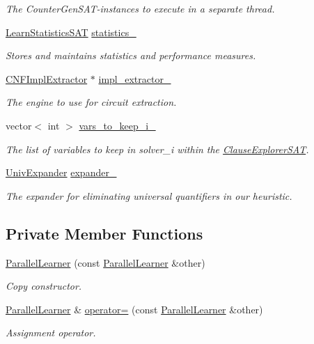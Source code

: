 \begin{DoxyCompactItemize}
\begin{DoxyCompactList}\small\item\em The Counter\-Gen\-S\-A\-T-\/instances to execute in a separate thread. \end{DoxyCompactList}\item 
\hyperlink{classLearnStatisticsSAT}{Learn\-Statistics\-S\-A\-T} \hyperlink{classParallelLearner_abfb2e28ec1a0f8775d3f14f75415a8bd}{statistics\-\_\-}
\begin{DoxyCompactList}\small\item\em Stores and maintains statistics and performance measures. \end{DoxyCompactList}\item 
\hyperlink{classCNFImplExtractor}{C\-N\-F\-Impl\-Extractor} $\ast$ \hyperlink{classParallelLearner_a58b6113b54eb7c91bbf15546d575f5e8}{impl\-\_\-extractor\-\_\-}
\begin{DoxyCompactList}\small\item\em The engine to use for circuit extraction. \end{DoxyCompactList}\item 
vector$<$ int $>$ \hyperlink{classParallelLearner_a959125f97b90cff7b2a08868ec48c0a1}{vars\-\_\-to\-\_\-keep\-\_\-i\-\_\-}
\begin{DoxyCompactList}\small\item\em The list of variables to keep in solver\-\_\-i within the \hyperlink{classClauseExplorerSAT}{Clause\-Explorer\-S\-A\-T}. \end{DoxyCompactList}\item 
\hyperlink{classUnivExpander}{Univ\-Expander} \hyperlink{classParallelLearner_a35a8e2d1a8263ae7ad71fdae77ff972d}{expander\-\_\-}
\begin{DoxyCompactList}\small\item\em The expander for eliminating universal quantifiers in our heuristic. \end{DoxyCompactList}\end{DoxyCompactItemize}
\subsection*{Private Member Functions}
\begin{DoxyCompactItemize}
\item 
\hyperlink{classParallelLearner_a7857993d63e497f5c946030c3127a578}{Parallel\-Learner} (const \hyperlink{classParallelLearner}{Parallel\-Learner} \&other)
\begin{DoxyCompactList}\small\item\em Copy constructor. \end{DoxyCompactList}\item 
\hyperlink{classParallelLearner}{Parallel\-Learner} \& \hyperlink{classParallelLearner_a870e6d78e50b8aed63555e797ff6cce4}{operator=} (const \hyperlink{classParallelLearner}{Parallel\-Learner} \&other)
\begin{DoxyCompactList}\small\item\em Assignment operator. \end{DoxyCompactList}\end{DoxyCompactItemize}


